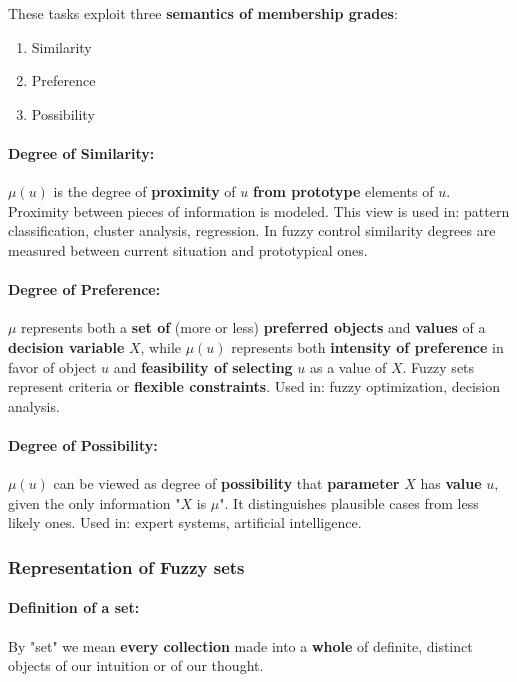 These tasks exploit three \textbf{semantics of membership grades}: 
\begin{enumerate}
	\item Similarity 
	\item Preference 
	\item Possibility
\end{enumerate}

\paragraph{Degree of Similarity:} $\mu(u)$ is the degree of \textbf{proximity} of $u$ \textbf{from prototype} elements of $u$. Proximity between pieces of information is modeled. This view is used in: pattern classification, cluster analysis, regression. In fuzzy control similarity degrees are measured between current situation and prototypical ones.\\

\paragraph{Degree of Preference:} $\mu$ represents both a \textbf{set of} (more or less) \textbf{preferred objects} and \textbf{values} of a \textbf{decision variable} $X$, while $\mu (u)$ represents both \textbf{intensity of preference} in favor of object $u$ and \textbf{feasibility of selecting} $u$ as a value of $X$. Fuzzy sets represent criteria or \textbf{flexible constraints}. Used in: fuzzy optimization, decision analysis.\\

\paragraph{Degree of Possibility:} $\mu (u)$ can be viewed as degree of \textbf{possibility} that \textbf{parameter} $X$ has \textbf{value} $u$, given the only information "$X$ is $\mu$". It distinguishes plausible cases from less likely ones. Used in: expert systems, artificial intelligence.\\

\newpage

\subsubsection{Representation of Fuzzy sets}

\paragraph{Definition of a set:} By "set" we mean \textbf{every collection} made into a \textbf{whole} of definite, distinct objects of our intuition or of our thought.\\

